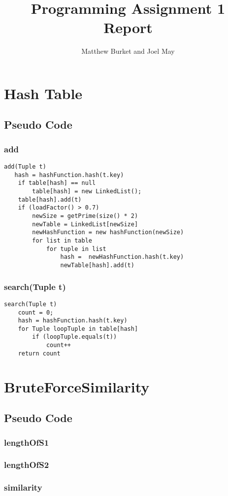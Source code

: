 \documentclass[10pt,letterpaper]{article}
\author{Matthew Burket and Joel May}
\title{Programming Assignment 1 Report}
\begin{document}
\maketitle
\section{Hash Table}
\subsection{Pseudo Code} 
\subsubsection{add}
\begin{verbatim}
add(Tuple t)
   hash = hashFunction.hash(t.key)
    if table[hash] == null
        table[hash] = new LinkedList();
    table[hash].add(t)
    if (loadFactor() > 0.7) 
        newSize = getPrime(size() * 2)
        newTable = LinkedList[newSize]
        newHashFunction = new hashFunction(newSize)
        for list in table
            for tuple in list
                hash =  newHashFunction.hash(t.key)
                newTable[hash].add(t)
\end{verbatim}
\subsubsection{search(Tuple t)}
\begin{verbatim}
search(Tuple t) 
    count = 0;
    hash = hashFunction.hash(t.key)
    for Tuple loopTuple in table[hash]
        if (loopTuple.equals(t))
            count++
    return count
\end{verbatim}
\section{BruteForceSimilarity}
\subsection{Pseudo Code}
\subsubsection{lengthOfS1}
\subsubsection{lengthOfS2}
\subsubsection{similarity}
\end{document}
